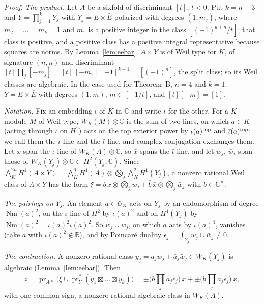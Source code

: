 \documentclass[11pt]{amsart}
\theoremstyle{definition}
\theoremstyle{remark}
\newcommand{\C}{\mathbb C}
\newcommand{\R}{\mathbb R}
\newcommand{\Nm}{\operatorname{Nm}}
\begin{document}
\begin{proof}
\emph{The product.} Let $A$ be a sixfold of discriminant $[t]$, $t<0$. Put $k=n-3$ and $Y=\prod_{j=1}^kY_j$ with $Y_j=E\times\bar E$ polarized with degrees $(1,m_j)$, where $m_2=\dots=m_k=1$ and $m_1$ is a positive integer in the class $[(-1)^{k+n}/t]$; that class is positive, and a positive class has a positive integral representative because squares are norms. By Lemma~\ref{lem:eebar}, $A\times Y$ is of Weil type for $K$, of signature $(n,n)$ and discriminant $[t]\prod_j[-m_j]=[t]\,[-m_1]\,[-1]^{k-1}=[(-1)^n]$, the split class; so its Weil classes are algebraic. In the case used for Theorem~B, $n=4$ and $k=1$: $Y=E\times\bar E$ with degrees $(1,m)$, $m\in[-1/t]$, and $[t][-m]=[1]$.

\emph{Notation.} Fix an embedding $\iota$ of $K$ in $\C$ and write $\bar\iota$ for the other. For a $K$-module $M$ of Weil type, $W_K(M)\otimes\C$ is the sum of two lines, on which $a\in K$ (acting through $\iota$ on $H^1$) acts on the top exterior power by $\iota(a)^{\rm top}$ and $\bar\iota(a)^{\rm top}$; we call them the $\iota$-line and the $\bar\iota$-line, and complex conjugation exchanges them. Let $x$ span the $\iota$-line of $W_K(A)\otimes\C$, so $\bar x$ spans the $\bar\iota$-line, and let $w_j$, $\bar w_j$ span those of $W_K(Y_j)\otimes\C\subset H^2(Y_j,\C)$. Since $\bigwedge^{2n}_KH^1(A\times Y)=\bigwedge^6_KH^1(A)\otimes\bigotimes_j\bigwedge^2_KH^1(Y_j)$, a nonzero rational Weil class of $A\times Y$ has the form $\xi=b\,x\otimes\bigotimes_jw_j+\bar b\,\bar x\otimes\bigotimes_j\bar w_j$ with $b\in\C^\times$.

\emph{The pairings on $Y_j$.} An element $a\in\mathcal O_K$ acts on $Y_j$ by an endomorphism of degree $\Nm(a)^2$, on the $\iota$-line of $H^2$ by $\iota(a)^2$ and on $H^4(Y_j)$ by $\Nm(a)^2=\iota(a)^2\bar\iota(a)^2$. So $w_j\cup w_j$, on which $a$ acts by $\iota(a)^4$, vanishes (take $a$ with $\iota(a)^2\notin\R$), and by Poincar\'e duality $\epsilon_j=\int_{Y_j}w_j\cup\bar w_j\ne0$.

\emph{The contraction.} A nonzero rational class $y_j=a_jw_j+\bar a_j\bar w_j\in W_K(Y_j)$ is algebraic (Lemma~\ref{lem:eebar}). Then
\[
z=\operatorname{pr}_{A*}\big(\xi\cup\operatorname{pr}_Y^*(y_1\boxtimes\dots\boxtimes y_k)\big)=\pm\Big(b\textstyle\prod_j\bar a_j\epsilon_j\Big)\,x+\pm\overline{\Big(b\textstyle\prod_j\bar a_j\epsilon_j\Big)}\,\bar x,
\]
with one common sign, a nonzero rational algebraic class in $W_K(A)$.


\end{proof}
\end{document}
